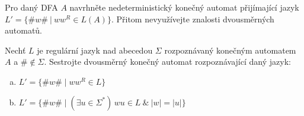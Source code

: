 \documentclass[a4paper,12pt]{amsart}
\begin{document}
\medskip\begin{problem}
    
    Pro daný DFA $A$ navrhněte nedeterministický konečný automat přijímající jazyk $L'=\{\#w\#\ |\ ww^R\in L(A)\}$. Přitom nevyužívejte znalosti dvousměrných automatů.

\end{problem}


\medskip\begin{problem}
    
    Nechť $L$ je regulární jazyk nad abecedou $\Sigma$ rozpoznávaný konečným automatem $A$ a $\#\notin\Sigma$. Sestrojte dvousměrný konečný automat rozpoznávající daný jazyk: 
    
    \begin{enumerate}[(a)]
        \item $L' = \{\#w\#\mid ww^R \in L\}$
        \item $L' = \{\#w\#\mid (\exists u \in\Sigma^*)\, wu \in L\ \& \ |w|=|u|\}$
    \end{enumerate}

\end{problem}
\end{document}
